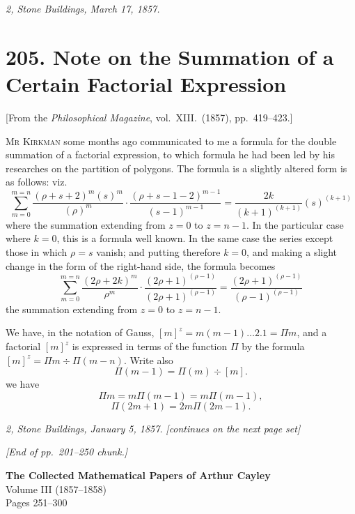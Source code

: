 \documentclass[11pt,a4paper]{book}
\begin{document}
\bigskip

\noindent\textit{2, Stone Buildings, March 17, 1857.}

\newpage


\section*{205. Note on the Summation of a Certain Factorial Expression}

\begin{center}
[From the \textit{Philosophical Magazine}, vol.~XIII.~(1857), pp.~419--423.]
\end{center}

\bigskip

M\textsc{r} K\textsc{irkman} some months ago communicated to me a formula for the double
summation of a factorial expression, to which formula he had been led by his researches
on the partition of polygons. The formula is a slightly altered form is as follows: viz.
\[
\sum_{m=0}^{m=n}\frac{(\rho + s + 2)^m(s)^m}{(\rho)^m} \cdot \frac{(\rho + s - 1 - 2)^{m-1}}{(s-1)^{m-1}} = \frac{2k}{(k+1)^{(k+1)}}(s)^{(k+1)}
\]
where the summation extending from $z = 0$ to $z = n - 1$. In the particular case where $k = 0$,
this is a formula well known. In the same case the series except those in which
$\rho = s$ vanish; and putting therefore $k = 0$, and making a slight change in
the form of the right-hand side, the formula becomes
\[
\sum_{m=0}^{m=n}\frac{(2\rho + 2k)^m}{\rho^m}\cdot \frac{(2\rho + 1)^{(\rho-1)}}{(2\rho+1)^{(\rho-1)}} = \frac{(2\rho + 1)^{(\rho-1)}}{(\rho-1)^{(\rho-1)}}
\]
the summation extending from $z = 0$ to $z = n - 1$.

\bigskip

We have, in the notation of Gauss, $[m]^z = m(m - 1)\ldots 2.1 = \Pi m$, and a factorial
$[m]^z$ is expressed in terms of the function $\Pi$ by the formula $[m]^z = \Pi m \div \Pi(m - n)$.
Write also
\[
\Pi(m - 1) = \Pi(m) \div [m].
\]
we have
\[
\Pi m = m \Pi(m - 1) = m \Pi(m - 1),
\]
\[
\Pi(2m + 1) = 2m \Pi(2m - 1).
\]

\bigskip

\noindent\textit{2, Stone Buildings, January 5, 1857.} \quad\textit{[continues on the next page set]}

\bigskip

\noindent\textit{[End of pp.~201--250 chunk.]}
\clearpage


\begin{center}
{\Large\bfseries The Collected Mathematical Papers of Arthur Cayley}\\[1em]
{\large Volume III (1857--1858)}\\[1em]
{\normalsize Pages 251--300}\\[2em]
\end{center}
\end{document}
